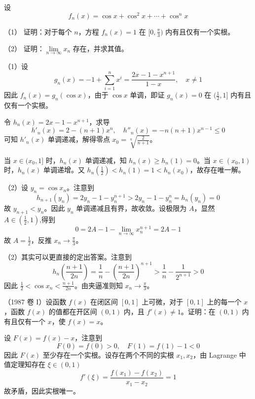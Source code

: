 \begin{problem}[000020]
设
\[ f_n(x) = \cos x + \cos^2 x + \cdots + \cos^n x \]

（1） 证明：对于每个 $n$，方程 $f_n(x) = 1$ 在 $[0, \frac{\pi}{3})$ 内有且仅有一个实根。

（2） 证明：$\lim\limits_{n \to \infty} x_n$ 存在，并求其值。
\end{problem}

\begin{solution}
	（1）设
	\[ g_n(x) =  - 1 + \sum_{i=1}^n x^i = \frac{2x - 1 - x^{n+1}}{1 - x}, \quad x \neq 1 \]
	因此 $f_n(x) = g_n(\cos x)$，由于 $\cos x$ 单调，即证 $g_n(x) = 0$ 在 $(\frac{1}{2}, 1]$ 内有且仅有一个实根。


	令 $h_n(x) = 2x - 1 - x^{n+1}$，求导
	\[ h'_n(x) = 2 - (n + 1)x^n, \quad h''_n(x) = - n(n+1) x^{n-1} \leqslant 0 \]
	可知 $h'_n(x)$ 单调递减，解得零点 $x_0 = \sqrt[n]{\frac{2}{n + 1}}$。

	当 $x \in (x_0, 1]$ 时，$h_n(x)$ 单调递减，知 $h_n(x) \geqslant h_n(1) = 0$。当 $x \in (x_0, 1)$ 时，$h_n(x)$ 单调递增。又 $h_n(\frac{1}{2}) <  h_n(1) = 1 < h_n(x_0)$，故存在唯一解。

	（2）设 $y_n = \cos x_n$。注意到
	\[ h_{n+1}(y_n) = 2 y_n - 1 - y_{n}^{n+1} > 2 y_n - 1 - y_{n}^n = h_n(y_n) = 0 \]
	故 $y_{n+1} < y_{n}$。因此 $y_n$ 单调递减且有界，故收敛。设极限为 $A$，显然 $A \in (\frac{1}{2}, 1)$,得到
	\[ 0 = 2A - 1 - \lim_{n \to \infty} x_n^{n+1} = 2A - 1 \]
	故 $A = \frac{1}{2}$，反推 $x_n \to \frac{\pi}{3}$。

	（2）其实可以更直接的定出答案。注意到
	\[ h_n\left(\frac{n + 1}{2n}\right) = \frac{1}{n} - \left(\frac{n + 1}{2n}\right)^{n+1} > \frac{1}{n} - \frac{1}{2^{n+1}} > 0 \]
	因此 $\frac{1}{2} < \cos x_n < \frac{n + 1}{2n}$。由夹逼准则知 $x_n \to \frac{\pi}{3}$。

\end{solution}

\begin{problem}[000021]
（1987 卷 I）设函数 $f(x)$ 在闭区间 $[0,1]$ 上可微，对于 $[0, 1]$ 上的每一个 $x$，函数 $f(x)$ 的值都在开区间 $(0, 1)$ 内，且 $f'(x) \neq 1$。证明：在 $(0, 1)$ 内有且仅有一个 $x$，使 $f(x) = x$。
\end{problem}

\begin{solution}
	设 $F(x) = f(x) - x$，注意到
	\[ F(0) = f(0) > 0, \quad F(1) = f(1) - 1 < 0 \]
	因此 $F(x)$ 至少存在一个实根。设存在两个不同的实根 $x_1, x_2$，由 Lagrange 中值定理知存在 $\xi \in (0, 1)$
	\[ f'(\xi) = \frac{f(x_1) - f(x_2)}{x_1 - x_2} = 1 \]
	故矛盾，因此实根唯一。
\end{solution}


